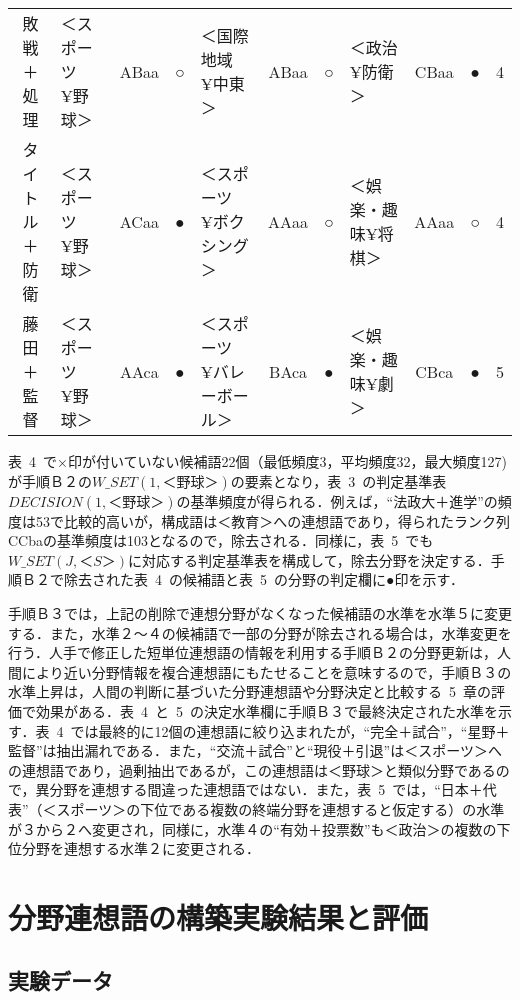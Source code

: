 \begin{sidewaystable}[p]
\begin{center}
\begin{tabular}{clcclcclccc}
敗戦＋処理 & ＜スポーツ¥野球＞ & ABaa & ○ & ＜国際地域¥中東＞ & ABaa & ○ & ＜政治¥防衛＞ & CBaa & ● & 4 \\
タイトル＋防衛 & ＜スポーツ¥野球＞ & ACaa & ● & ＜スポーツ¥ボクシング＞ & AAaa & ○ & ＜娯楽・趣味¥将棋＞ & AAaa & ○ & 4 \\
藤田＋監督 & ＜スポーツ¥野球＞ & AAca & ● & ＜スポーツ¥バレーボール＞ & BAca & ● & ＜娯楽・趣味¥劇＞ & CBca & ● & 5 \\
    \hline
  \end{tabular}
 \end{center}
\end{sidewaystable}

表~4~で×印が付いていない候補語22個（最低頻度3，平均頻度32，最大頻度127)が手順Ｂ２の$W\_SET(1,＜野球＞)$の要素となり，表~3~の判定基準表$DECISION(1,＜野球＞)$の基準頻度が得られる．例えば，``法政大＋進学''の頻度は53で比較的高いが，構成語は＜教育＞への連想語であり，得られたランク列CCbaの基準頻度は103となるので，除去される．同様に，表~5~でも$W\_SET(J,＜S＞)$に対応する判定基準表を構成して，除去分野を決定する．手順Ｂ２で除去された表~4~の候補語と表~5~の分野の判定欄に●印を示す．

手順Ｂ３では，上記の削除で連想分野がなくなった候補語の水準を水準５に変更する．また，水準２〜４の候補語で一部の分野が除去される場合は，水準変更を行う．人手で修正した短単位連想語の情報を利用する手順Ｂ２の分野更新は，人間により近い分野情報を複合連想語にもたせることを意味するので，手順Ｂ３の水準上昇は，人間の判断に基づいた分野連想語や分野決定と比較する~5~章の評価で効果がある．表~4~と~5~の決定水準欄に手順Ｂ３で最終決定された水準を示す．表~4~では最終的に12個の連想語に絞り込まれたが，``完全＋試合''，``星野＋監督''は抽出漏れである．また，``交流＋試合''と``現役＋引退''は＜スポーツ＞への連想語であり，過剰抽出であるが，この連想語は＜野球＞と類似分野であるので，異分野を連想する間違った連想語ではない．また，表~5~では，``日本＋代表''（＜スポーツ＞の下位である複数の終端分野を連想すると仮定する）の水準が３から２へ変更され，同様に，水準４の``有効＋投票数''も＜政治＞の複数の下位分野を連想する水準２に変更される．

\section{分野連想語の構築実験結果と評価}

\subsection{実験データ}

